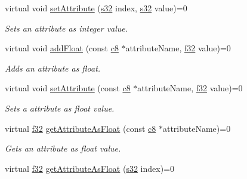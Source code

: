 \begin{DoxyCompactItemize}
\mbox{\label{classirr_1_1io_1_1IAttributes_aab68bfaf76afb61799ab0b6bc2d66cd7}} 
virtual void \hyperlink{classirr_1_1io_1_1IAttributes_aab68bfaf76afb61799ab0b6bc2d66cd7}{set\+Attribute} (\hyperlink{namespaceirr_ac66849b7a6ed16e30ebede579f9b47c6}{s32} index, \hyperlink{namespaceirr_ac66849b7a6ed16e30ebede579f9b47c6}{s32} value)=0
\begin{DoxyCompactList}\small\item\em Sets an attribute as integer value. \end{DoxyCompactList}\item 
\mbox{\label{classirr_1_1io_1_1IAttributes_a8e3add73bd9daba6f6e614361c659930}} 
virtual void \hyperlink{classirr_1_1io_1_1IAttributes_a8e3add73bd9daba6f6e614361c659930}{add\+Float} (const \hyperlink{namespaceirr_a9395eaea339bcb546b319e9c96bf7410}{c8} $\ast$attribute\+Name, \hyperlink{namespaceirr_a0277be98d67dc26ff93b1a6a1d086b07}{f32} value)=0
\begin{DoxyCompactList}\small\item\em Adds an attribute as float. \end{DoxyCompactList}\item 
\mbox{\label{classirr_1_1io_1_1IAttributes_ab6f77e30a926a509847439b345537aaf}} 
virtual void \hyperlink{classirr_1_1io_1_1IAttributes_ab6f77e30a926a509847439b345537aaf}{set\+Attribute} (const \hyperlink{namespaceirr_a9395eaea339bcb546b319e9c96bf7410}{c8} $\ast$attribute\+Name, \hyperlink{namespaceirr_a0277be98d67dc26ff93b1a6a1d086b07}{f32} value)=0
\begin{DoxyCompactList}\small\item\em Sets a attribute as float value. \end{DoxyCompactList}\item 
virtual \hyperlink{namespaceirr_a0277be98d67dc26ff93b1a6a1d086b07}{f32} \hyperlink{classirr_1_1io_1_1IAttributes_a9bfcf5b9dae3fa18796c74888bef977f}{get\+Attribute\+As\+Float} (const \hyperlink{namespaceirr_a9395eaea339bcb546b319e9c96bf7410}{c8} $\ast$attribute\+Name)=0
\begin{DoxyCompactList}\small\item\em Gets an attribute as float value. \end{DoxyCompactList}\item 
virtual \hyperlink{namespaceirr_a0277be98d67dc26ff93b1a6a1d086b07}{f32} \hyperlink{classirr_1_1io_1_1IAttributes_a9ef1a4d52b39daa2f0645df4eb8f40a9}{get\+Attribute\+As\+Float} (\hyperlink{namespaceirr_ac66849b7a6ed16e30ebede579f9b47c6}{s32} index)=0

\end{DoxyCompactItemize}
